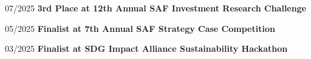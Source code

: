 \begin{twocolentry}{07/2025}
    \textbf{3rd Place at 12th Annual SAF Investment Research Challenge}
\end{twocolentry}
\vspace{0.1 cm}
\begin{twocolentry}{05/2025}
    \textbf{Finalist at 7th Annual SAF Strategy Case Competition}
\end{twocolentry}
\vspace{0.1 cm}
\begin{twocolentry}{03/2025}
    \textbf{Finalist at SDG Impact Alliance Sustainability Hackathon}
\end{twocolentry}


